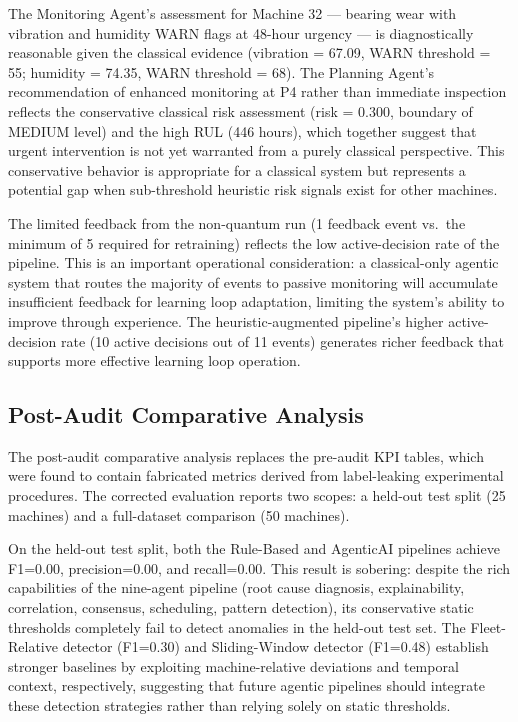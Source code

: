 The Monitoring Agent's assessment for Machine 32 --- bearing wear with vibration and humidity WARN flags at 48-hour urgency --- is diagnostically reasonable given the classical evidence (vibration = 67.09, WARN threshold = 55; humidity = 74.35, WARN threshold = 68). The Planning Agent's recommendation of enhanced monitoring at P4 rather than immediate inspection reflects the conservative classical risk assessment (risk = 0.300, boundary of MEDIUM level) and the high RUL (446 hours), which together suggest that urgent intervention is not yet warranted from a purely classical perspective. This conservative behavior is appropriate for a classical system but represents a potential gap when sub-threshold heuristic risk signals exist for other machines.

The limited feedback from the non-quantum run (1 feedback event vs.\ the minimum of 5 required for retraining) reflects the low active-decision rate of the pipeline. This is an important operational consideration: a classical-only agentic system that routes the majority of events to passive monitoring will accumulate insufficient feedback for learning loop adaptation, limiting the system's ability to improve through experience. The heuristic-augmented pipeline's higher active-decision rate (10 active decisions out of 11 events) generates richer feedback that supports more effective learning loop operation.

\subsection{Post-Audit Comparative Analysis}

The post-audit comparative analysis replaces the pre-audit KPI tables, which were found to contain fabricated metrics derived from label-leaking experimental procedures. The corrected evaluation reports two scopes: a held-out test split (25 machines) and a full-dataset comparison (50 machines).

On the held-out test split, both the Rule-Based and AgenticAI pipelines achieve F1=0.00, precision=0.00, and recall=0.00. This result is sobering: despite the rich capabilities of the nine-agent pipeline (root cause diagnosis, explainability, correlation, consensus, scheduling, pattern detection), its conservative static thresholds completely fail to detect anomalies in the held-out test set. The Fleet-Relative detector (F1=0.30) and Sliding-Window detector (F1=0.48) establish stronger baselines by exploiting machine-relative deviations and temporal context, respectively, suggesting that future agentic pipelines should integrate these detection strategies rather than relying solely on static thresholds.

